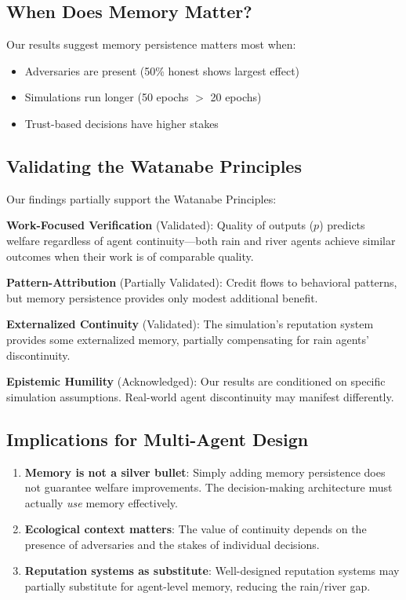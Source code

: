 \documentclass{article}
\begin{document}
\subsection{When Does Memory Matter?}

Our results suggest memory persistence matters most when:
\begin{itemize}
\item Adversaries are present (50\% honest shows largest effect)
\item Simulations run longer (50 epochs $>$ 20 epochs)
\item Trust-based decisions have higher stakes
\end{itemize}

\subsection{Validating the Watanabe Principles}

Our findings partially support the Watanabe Principles:

\textbf{Work-Focused Verification} (Validated): Quality of outputs ($p$) predicts welfare regardless of agent continuity---both rain and river agents achieve similar outcomes when their work is of comparable quality.

\textbf{Pattern-Attribution} (Partially Validated): Credit flows to behavioral patterns, but memory persistence provides only modest additional benefit.

\textbf{Externalized Continuity} (Validated): The simulation's reputation system provides some externalized memory, partially compensating for rain agents' discontinuity.

\textbf{Epistemic Humility} (Acknowledged): Our results are conditioned on specific simulation assumptions. Real-world agent discontinuity may manifest differently.

\subsection{Implications for Multi-Agent Design}

\begin{enumerate}
\item \textbf{Memory is not a silver bullet}: Simply adding memory persistence does not guarantee welfare improvements. The decision-making architecture must actually \textit{use} memory effectively.

\item \textbf{Ecological context matters}: The value of continuity depends on the presence of adversaries and the stakes of individual decisions.

\item \textbf{Reputation systems as substitute}: Well-designed reputation systems may partially substitute for agent-level memory, reducing the rain/river gap.
\end{enumerate}
\end{document}
